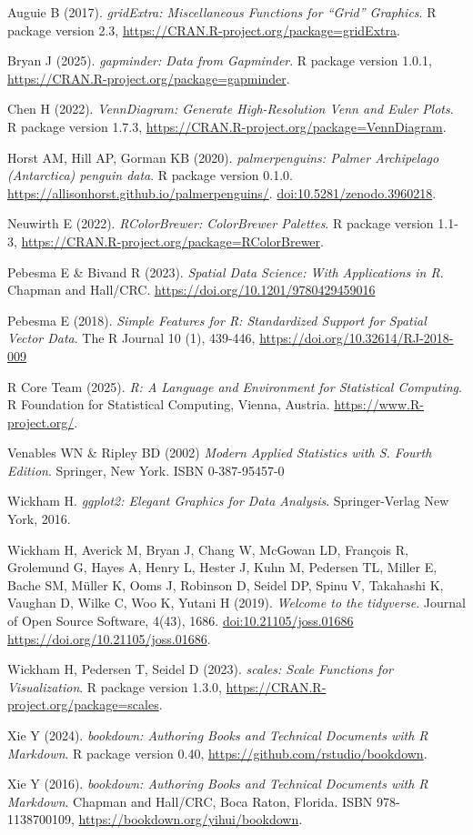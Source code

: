 \documentclass[
]{book}
\begin{document}
Auguie B (2017). \emph{gridExtra: Miscellaneous Functions for ``Grid'' Graphics}. R package version 2.3,
\url{https://CRAN.R-project.org/package=gridExtra}.

Bryan J (2025). \emph{gapminder: Data from Gapminder}. R package version 1.0.1,
\url{https://CRAN.R-project.org/package=gapminder}.

Chen H (2022). \emph{VennDiagram: Generate High-Resolution Venn and Euler Plots}. R package version 1.7.3,
\url{https://CRAN.R-project.org/package=VennDiagram}.

Horst AM, Hill AP, Gorman KB (2020). \emph{palmerpenguins: Palmer Archipelago (Antarctica) penguin data}. R package version
0.1.0. \url{https://allisonhorst.github.io/palmerpenguins/}. \url{doi:10.5281/zenodo.3960218}.

Neuwirth E (2022). \emph{RColorBrewer: ColorBrewer Palettes}. R package version 1.1-3,
\url{https://CRAN.R-project.org/package=RColorBrewer}.

Pebesma E \& Bivand R (2023). \emph{Spatial Data Science: With Applications in R}. Chapman and Hall/CRC.
\url{https://doi.org/10.1201/9780429459016}

Pebesma E (2018). \emph{Simple Features for R: Standardized Support for Spatial Vector Data}. The R Journal 10 (1), 439-446,
\url{https://doi.org/10.32614/RJ-2018-009}

R Core Team (2025). \emph{R: A Language and Environment for Statistical Computing}. R Foundation for Statistical Computing,
Vienna, Austria. \url{https://www.R-project.org/}.

Venables WN \& Ripley BD (2002) \emph{Modern Applied Statistics with S. Fourth Edition}. Springer, New York. ISBN
0-387-95457-0

Wickham H. \emph{ggplot2: Elegant Graphics for Data Analysis}. Springer-Verlag New York, 2016.

Wickham H, Averick M, Bryan J, Chang W, McGowan LD, François R, Grolemund G, Hayes A, Henry L, Hester J, Kuhn M, Pedersen
TL, Miller E, Bache SM, Müller K, Ooms J, Robinson D, Seidel DP, Spinu V, Takahashi K, Vaughan D, Wilke C, Woo K, Yutani
H (2019). \emph{Welcome to the tidyverse}. Journal of Open Source Software, 4(43), 1686. \url{doi:10.21105/joss.01686}
\url{https://doi.org/10.21105/joss.01686}.

Wickham H, Pedersen T, Seidel D (2023). \emph{scales: Scale Functions for Visualization}. R package version 1.3.0,
\url{https://CRAN.R-project.org/package=scales}.

Xie Y (2024). \emph{bookdown: Authoring Books and Technical Documents with R Markdown}. R package version 0.40,
\url{https://github.com/rstudio/bookdown}.

Xie Y (2016). \emph{bookdown: Authoring Books and Technical Documents with R Markdown}. Chapman and Hall/CRC, Boca Raton, Florida.
ISBN 978-1138700109, \url{https://bookdown.org/yihui/bookdown}.


\end{document}
